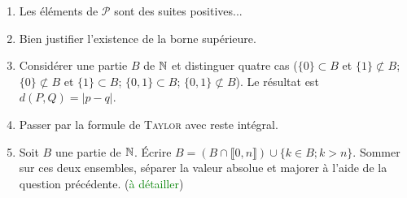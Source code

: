 \begin{elem_sol}
    \begin{enumerate}
        \item Les éléments de $\mathscr{P}$ sont des suites positives...
        \item Bien justifier l'existence de la borne supérieure.
        \item Considérer une partie $B$ de $\mathbb{N}$ et distinguer quatre cas ($\{0\} \subset B$ et $\{1\} \not\subset B$; $\{0\} \not\subset B$ et $\{1\} \subset B$; $\{0, 1\} \subset B$; $ \{0, 1\} \not\subset B$). Le résultat est $d(P, Q) = |p-q|$.
        \item Passer par la formule de \textsc{Taylor} avec reste intégral.
        \item Soit $B$ une partie de $\mathbb{N}$. Écrire $B = \left(B \cap \llbracket0, n \rrbracket \right) \cup \{k \in B; k > n\}$. Sommer sur ces deux ensembles, séparer la valeur absolue et majorer à l'aide de la question précédente. (\textcolor{green}{à détailler})
    \end{enumerate}
\end{elem_sol}
